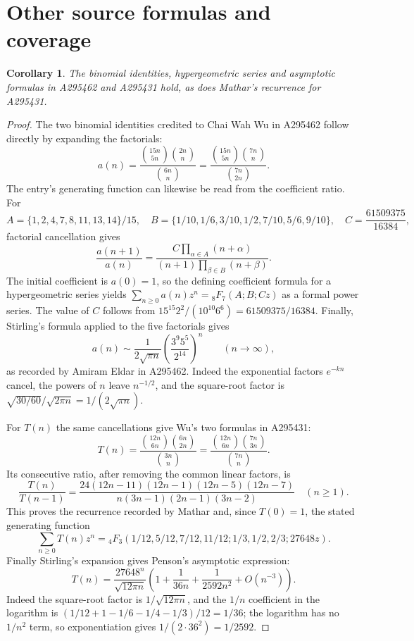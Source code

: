\documentclass[11pt]{article}
\newtheorem{corollary}[theorem]{Corollary}
\begin{document}
\section{Other source formulas and coverage}
\begin{corollary}\label{cor:formulas}
The binomial identities, hypergeometric series and asymptotic formulas
in A295462 and A295431 hold, as does Mathar's recurrence for A295431.
\end{corollary}
\begin{proof}
The two binomial identities credited to Chai Wah Wu in A295462 follow
directly by expanding the factorials:
\[
 a(n)=\frac{\binom{15n}{5n}\binom{2n}{n}}{\binom{6n}{n}}
     =\frac{\binom{15n}{5n}\binom{7n}{n}}{\binom{7n}{2n}}.
\]
The entry's generating function can likewise be read from the coefficient
ratio. For
\[
 A=\{1,2,4,7,8,11,13,14\}/15,\quad
 B=\{1/10,1/6,3/10,1/2,7/10,5/6,9/10\},\quad
 C=\frac{61509375}{16384},
\]
factorial cancellation gives
\[
 \frac{a(n+1)}{a(n)}
 =\frac{C\prod_{\alpha\in A}(n+\alpha)}
 {(n+1)\prod_{\beta\in B}(n+\beta)}.
\]
The initial coefficient is $a(0)=1$, so the defining coefficient formula
for a hypergeometric series yields
$\sum_{n\geq0}a(n)z^n={}_8F_7(A;B;Cz)$ as a formal power series.
The value of $C$ follows from
$15^{15}2^2/(10^{10}6^6)=61509375/16384$.
Finally, Stirling's formula applied to the five factorials gives
\[
 a(n)\sim\frac{1}{2\sqrt{\pi n}}
 \left(\frac{3^9 5^5}{2^{14}}\right)^n
 \qquad(n\longrightarrow\infty),
\]
as recorded by Amiram Eldar in A295462. Indeed the exponential factors
$e^{-kn}$ cancel, the powers of $n$ leave $n^{-1/2}$, and the square-root
factor is $\sqrt{30/60}/\sqrt{2\pi n}=1/(2\sqrt{\pi n})$.

For $T(n)$ the same cancellations give Wu's two formulas in A295431:
\[
 T(n)=\frac{\binom{12n}{6n}\binom{6n}{2n}}{\binom{3n}{n}}
     =\frac{\binom{12n}{6n}\binom{7n}{3n}}{\binom{7n}{n}}.
\]
Its consecutive ratio, after removing the common linear factors, is
\[
 \frac{T(n)}{T(n-1)}=
 \frac{24(12n-11)(12n-1)(12n-5)(12n-7)}
 {n(3n-1)(2n-1)(3n-2)}\quad(n\geq1).
\]
This proves the recurrence recorded by Mathar and, since $T(0)=1$,
the stated generating function
\[
 \sum_{n\geq0}T(n)z^n=
 {}_4F_3(1/12,5/12,7/12,11/12;1/3,1/2,2/3;27648z).
\]
Finally Stirling's expansion gives Penson's asymptotic expression:
\[
 T(n)=\frac{27648^n}{\sqrt{12\pi n}}
 \left(1+\frac{1}{36n}+\frac{1}{2592n^2}+O(n^{-3})\right).
\]
Indeed the square-root factor is $1/\sqrt{12\pi n}$, and the
$1/n$ coefficient in the logarithm is
$(1/12+1-1/6-1/4-1/3)/12=1/36$; the logarithm has no $1/n^2$
term, so exponentiation gives $1/(2\cdot36^2)=1/2592$.
\end{proof}
\end{document}
